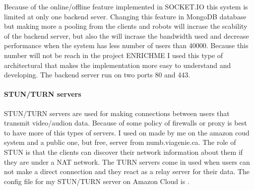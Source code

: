 Because of the online/offline feature implemented in SOCKET.IO this system is limited at only one backend sever.
Changing this feature in MongoDB database but making more a pooling from the clients and robots will
incrase the scability of the backend server, but also the will incrase the bandwidth used and
decrease performance when the system has less number of users than 40000. Because this number will
not be reach in the project ENRICHME I used this type of architectural that makes the implementation
more easy to understand and developing. The backend server run on two ports 80 and 443.

\paragraph{STUN/TURN servers}
STUN/TURN servers are used for making connections between users that transmit video/audion
data. Because of some policy of firewalls or proxy is best to have more of this types of servers.
I used on made by me on the amazon coud system and a public one, but free, server from numb.viagenie.ca.
The role of STUN is that the clients can discover their network information about them if they are
under a NAT network. The TURN servers come in used when users can not make a direct connection and they
react as a relay server for their data. The config file for my STUN/TURN server on Amazon Cloud is .

